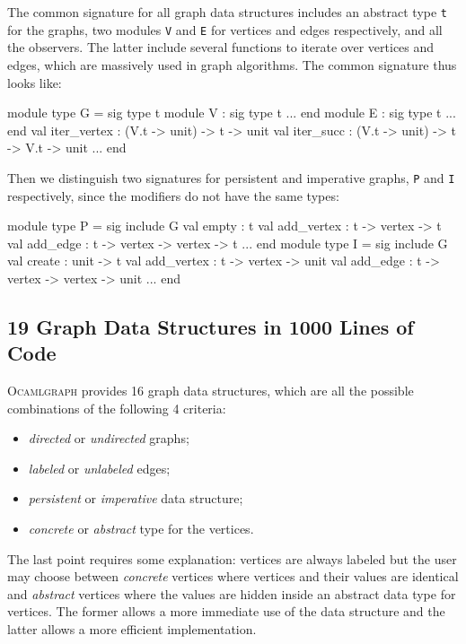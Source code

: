 \documentclass[tfpsymp]{tfp05symp}
\newcommand{\ocamlgraph}{\textsc{Ocamlgraph}\xspace}
\begin{document}
The common signature for all graph data structures includes an
abstract type \texttt{t} for the graphs, two modules \texttt{V} and
\texttt{E} for vertices and edges respectively, and all the
observers. The latter include several functions to iterate over
vertices and edges, which are massively used in graph algorithms. 
The common signature thus looks like:
\begin{ocaml}
module type G = sig
  type t
  module V : sig type t ... end
  module E : sig type t ... end
  val iter_vertex : (V.t -> unit) -> t -> unit
  val iter_succ : (V.t -> unit) -> t -> V.t -> unit
  ...
end
\end{ocaml}
Then we distinguish two signatures for persistent and imperative
graphs, \texttt{P} and \texttt{I} respectively, since the modifiers do
not have the same types:
\begin{ocaml}
module type P = sig
  include G
  val empty : t
  val add_vertex : t -> vertex -> t
  val add_edge : t -> vertex -> vertex -> t
  ...
end
module type I = sig
  include G
  val create : unit -> t
  val add_vertex : t -> vertex -> unit
  val add_edge : t -> vertex -> vertex -> unit
  ...
end
\end{ocaml}

\subsection{19 Graph Data Structures in 1000 Lines of Code}\label{structuresdedonnees}

\ocamlgraph provides 16 graph data structures, which are all the
possible combinations of the following 4 criteria:
\begin{itemize}
\item \emph{directed} or \emph{undirected} graphs;
\item \emph{labeled} or \emph{unlabeled} edges;
\item \emph{persistent} or \emph{imperative} data structure;
\item \emph{concrete} or \emph{abstract} type for the vertices.
\end{itemize}
The last point requires some explanation: vertices are always labeled
but the user may choose between \emph{concrete} vertices where vertices and
their values are identical and \emph{abstract} vertices where the
values are hidden inside an abstract data type for vertices. The
former allows a more immediate use of the data structure and the
latter allows a more efficient implementation.
\end{document}
